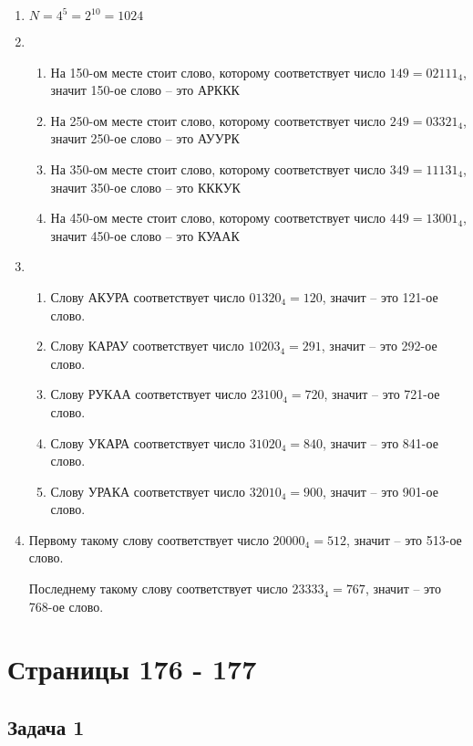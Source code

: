 \documentclass[12pt, a4paper]{article}
\begin{document}
  \begin{enumerate}
    \item $ N = 4^{5} = 2^{10} = 1024 $
    \item 
      \begin{enumerate}
        \item На 150-ом месте стоит слово, которому соответствует число $ 149 = 02111_4 $,
      значит 150-ое слово -- это АРККК
        \item На 250-ом месте стоит слово, которому соответствует число $ 249 = 03321_4 $,
      значит 250-ое слово -- это АУУРК
        \item На 350-ом месте стоит слово, которому соответствует число $ 349 = 11131_4 $,
      значит 350-ое слово -- это КККУК
        \item На 450-ом месте стоит слово, которому соответствует число $ 449 = 13001_4 $,
      значит 450-ое слово -- это КУААК
      \end{enumerate}
    \item
      \begin{enumerate}
        \item Слову АКУРА соответствует число $ 01320_4 = 120 $, значит -- это 121-ое слово.
        \item Слову КАРАУ соответствует число $ 10203_4 = 291 $, значит -- это 292-ое слово.
        \item Слову РУКАА соответствует число $ 23100_4 = 720 $, значит -- это 721-ое слово.
        \item Слову УКАРА соответствует число $ 31020_4 = 840 $, значит -- это 841-ое слово.
        \item Слову УРАКА соответствует число $ 32010_4 = 900 $, значит -- это 901-ое слово.
      \end{enumerate}
    \item
      Первому такому слову соответствует число $ 20000_4 = 512 $, значит -- это 513-ое слово.

      Последнему такому слову соответствует число $ 23333_4 = 767 $, значит -- это 768-ое слово.
  \end{enumerate}

  \section{Страницы 176 - 177}
  \subsection{Задача 1}
\end{document}

